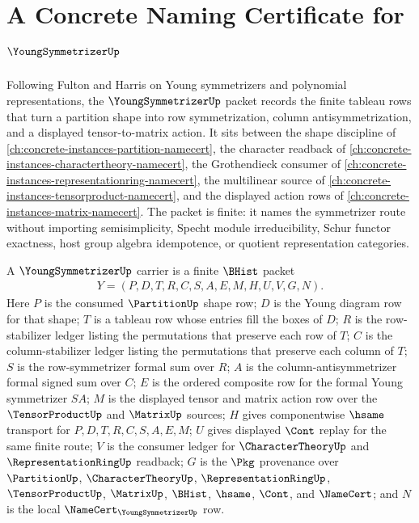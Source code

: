 \chapter{A Concrete Naming Certificate for $\YoungSymmetrizerUp$}
\label{ch:concrete-instances-young-symmetrizer-namecert}

Following Fulton and Harris on Young symmetrizers and polynomial representations, the $\YoungSymmetrizerUp$ packet records the finite tableau rows that turn a partition shape into row symmetrization, column antisymmetrization, and a displayed tensor-to-matrix action. It sits between the shape discipline of \autoref{ch:concrete-instances-partition-namecert}, the character readback of \autoref{ch:concrete-instances-charactertheory-namecert}, the Grothendieck consumer of \autoref{ch:concrete-instances-representationring-namecert}, the multilinear source of \autoref{ch:concrete-instances-tensorproduct-namecert}, and the displayed action rows of \autoref{ch:concrete-instances-matrix-namecert}. The packet is finite: it names the symmetrizer route without importing semisimplicity, Specht module irreducibility, Schur functor exactness, host group algebra idempotence, or quotient representation categories.

\begin{definition}\label{def:young-symmetrizer-carrier}
A $\YoungSymmetrizerUp$ carrier is a finite $\BHist$ packet
$$
\begin{gathered}
Y=(P,D,T,R,C,S,A,E,M,H,U,V,G,N).
\end{gathered}
$$
Here $P$ is the consumed $\PartitionUp$ shape row; $D$ is the Young diagram row for that shape; $T$ is a tableau row whose entries fill the boxes of $D$; $R$ is the row-stabilizer ledger listing the permutations that preserve each row of $T$; $C$ is the column-stabilizer ledger listing the permutations that preserve each column of $T$; $S$ is the row-symmetrizer formal sum over $R$; $A$ is the column-antisymmetrizer formal signed sum over $C$; $E$ is the ordered composite row for the formal Young symmetrizer $S A$; $M$ is the displayed tensor and matrix action row over the $\TensorProductUp$ and $\MatrixUp$ sources; $H$ gives componentwise $\hsame$ transport for $P,D,T,R,C,S,A,E,M$; $U$ gives displayed $\Cont$ replay for the same finite route; $V$ is the consumer ledger for $\CharacterTheoryUp$ and $\RepresentationRingUp$ readback; $G$ is the $\Pkg$ provenance over $\PartitionUp$, $\CharacterTheoryUp$, $\RepresentationRingUp$, $\TensorProductUp$, $\MatrixUp$, $\BHist$, $\hsame$, $\Cont$, and $\NameCert$; and $N$ is the local $\NameCert_{\YoungSymmetrizerUp}$ row.
\end{definition}

